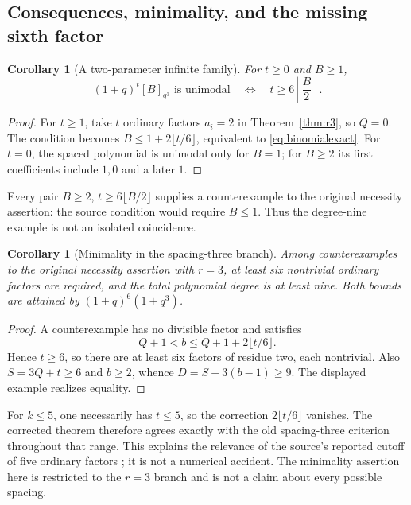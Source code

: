 \documentclass[11pt]{article}
\theoremstyle{research}
\newtheorem{corollary}[theorem]{Corollary}
\theoremstyle{definition}
\newcommand{\qir}[2]{[#1]_{q^{#2}}}
\numberwithin{equation}{section}
\begin{document}
\subsection{Consequences, minimality, and the missing sixth factor}
\begin{corollary}[A two-parameter infinite family]\label{cor:binomialexact}
For $t\ge0$ and $B\ge1$,
\begin{equation}\label{eq:binomialexact}
 (1+q)^t\qir B3\text{ is unimodal}
 \quad\Longleftrightarrow\quad
 t\ge6\left\lfloor\frac B2\right\rfloor.
\end{equation}
\end{corollary}
\begin{proof}
For $t\ge1$, take $t$ ordinary factors $a_i=2$ in
Theorem~\ref{thm:r3}, so $Q=0$. The condition becomes
$B\le1+2\lfloor t/6\rfloor$, equivalent to \eqref{eq:binomialexact}.
For $t=0$, the spaced polynomial is unimodal only for $B=1$;
for $B\ge2$ its first coefficients include $1,0$ and a later $1$.
\end{proof}

Every pair $B\ge2$, $t\ge6\lfloor B/2\rfloor$ supplies a counterexample
to the original necessity assertion: the source condition would require
$B\le1$. Thus the degree-nine example is not an isolated coincidence.

\begin{corollary}[Minimality in the spacing-three branch]\label{cor:minimal}
Among counterexamples to the original necessity assertion with $r=3$,
at least six nontrivial ordinary factors are required, and the total
polynomial degree is at least nine. Both bounds are attained by
$(1+q)^6(1+q^3)$.
\end{corollary}
\begin{proof}
A counterexample has no divisible factor and satisfies
\[
 Q+1<b\le Q+1+2\lfloor t/6\rfloor.
\]
Hence $t\ge6$, so there are at least six factors of residue two, each
nontrivial. Also $S=3Q+t\ge6$ and $b\ge2$, whence
$D=S+3(b-1)\ge9$. The displayed example realizes equality.
\end{proof}

For $k\le5$, one necessarily has $t\le5$, so the correction
$2\lfloor t/6\rfloor$ vanishes. The corrected theorem therefore agrees
exactly with the old spacing-three criterion throughout that range.
This explains the relevance of the source's reported cutoff of five
ordinary factors \cite[p.~14]{CIMSY}; it is not a numerical accident.
The minimality assertion here is restricted to the $r=3$ branch and is
not a claim about every possible spacing.
\end{document}
